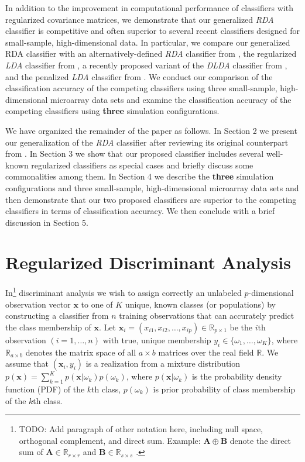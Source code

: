 \documentclass[11pt]{article}
\begin{document}
In addition to the improvement in computational performance of classifiers with regularized covariance matrices, we demonstrate that our generalized \emph{RDA} classifier is competitive and often superior to several recent classifiers designed for small-sample, high-dimensional data. In particular, we compare our generalized RDA classifier with an alternatively-defined \emph{RDA} classifier from \cite*{Hastie:2008dt}, the regularized \emph{LDA} classifier from \cite{Guo:2007te}, a recently proposed variant of the \emph{DLDA} classifier from \cite*{Tong:2012hw}, and the penalized \emph{LDA} classifier from \cite{Witten:2011kc}. We conduct our comparison of the classification accuracy of the competing classifiers using three small-sample, high-dimensional microarray data sets and examine the classification accuracy of the competing classifiers using \textbf{three} simulation configurations.

We have organized the remainder of the paper as follows. In Section 2 we present our generalization of the \emph{RDA} classifier after reviewing its original counterpart from \cite{Friedman:1989tm}. In Section 3 we show that our proposed classifier includes several well-known regularized classifiers as special cases and briefly discuss some commonalities among them. In Section 4 we describe the \textbf{three} simulation configurations and three small-sample, high-dimensional microarray data sets and then demonstrate that our two proposed classifiers are superior to the competing classifiers in terms of classification accuracy. We then conclude with a brief discussion in Section 5.

\section{Regularized Discriminant Analysis}
\label{sec:rda}

In\footnote{TODO: Add paragraph of other notation here, including null space, orthogonal complement, and direct sum. Example: $\bm A \oplus \bm B$ denote the direct sum of $\bm A \in \mathbb{R}_{r \times r}$ and $\bm B \in \mathbb{R}_{s \times s}$ \citep[Chapter 1]{Lutkepohl:1996uz}.} discriminant analysis we wish to assign correctly an unlabeled $p$-dimensional observation vector $\bm x$ to one of $K$ unique, known classes (or populations) by constructing a classifier from $n$ training observations that can accurately predict the class membership of $\bm x$. Let $\bm x_i = (x_{i1}, x_{i2}, \ldots, x_{ip}) \in \mathbb{R}_{p \times 1}$ be the $i$th observation $(i = 1, \ldots, n)$ with true, unique membership $y_i \in \{\omega_1, \ldots, \omega_K\}$, where $\mathbb{R}_{a \times b}$ denotes the matrix space of all $a \times b$ matrices over the real field $\mathbb{R}$. We assume that $(\bm x_i, y_i)$ is a realization from a mixture distribution $p(\bm x) = \sum_{k=1}^K p(\bm x | \omega_k) p(\omega_k)$, where $p(\bm x | \omega_k)$ is the probability density function (PDF) of the $k$th class, $p(\omega_k)$ is prior probability of class membership of the $k$th class.
\end{document}
